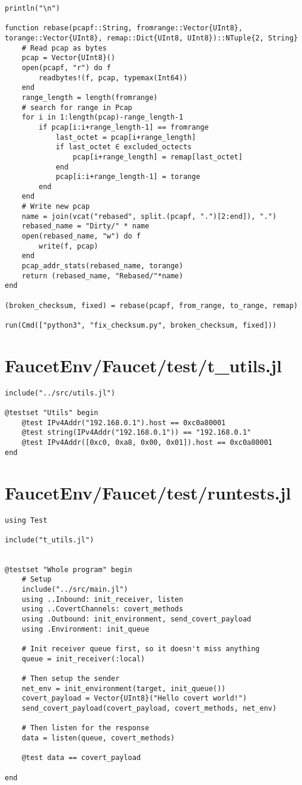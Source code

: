 \begin{lstlisting}[language=JuliaLocal, style=julia]
println("\n")

function rebase(pcapf::String, fromrange::Vector{UInt8}, torange::Vector{UInt8}, remap::Dict{UInt8, UInt8})::NTuple{2, String}
    # Read pcap as bytes
    pcap = Vector{UInt8}()
    open(pcapf, "r") do f
        readbytes!(f, pcap, typemax(Int64))
    end
    range_length = length(fromrange)
    # search for range in Pcap
    for i in 1:length(pcap)-range_length-1
        if pcap[i:i+range_length-1] == fromrange
            last_octet = pcap[i+range_length]
            if last_octet ∈ excluded_octects
                pcap[i+range_length] = remap[last_octet]
            end
            pcap[i:i+range_length-1] = torange
        end
    end
    # Write new pcap
    name = join(vcat("rebased", split.(pcapf, ".")[2:end]), ".")
    rebased_name = "Dirty/" * name
    open(rebased_name, "w") do f
        write(f, pcap)
    end
    pcap_addr_stats(rebased_name, torange)
    return (rebased_name, "Rebased/"*name)
end

(broken_checksum, fixed) = rebase(pcapf, from_range, to_range, remap)

run(Cmd(["python3", "fix_checksum.py", broken_checksum, fixed]))
\end{lstlisting}
\section{FaucetEnv/Faucet/test/t\_utils.jl}
\begin{lstlisting}[language=JuliaLocal, style=julia]
include("../src/utils.jl")

@testset "Utils" begin
	@test IPv4Addr("192.168.0.1").host == 0xc0a80001
	@test string(IPv4Addr("192.168.0.1")) == "192.168.0.1"
	@test IPv4Addr([0xc0, 0xa8, 0x00, 0x01]).host == 0xc0a80001
end
\end{lstlisting}
\section{FaucetEnv/Faucet/test/runtests.jl}
\begin{lstlisting}[language=JuliaLocal, style=julia]
using Test

include("t_utils.jl")


@testset "Whole program" begin
	# Setup
	include("../src/main.jl")
	using ..Inbound: init_receiver, listen
	using ..CovertChannels: covert_methods
	using .Outbound: init_environment, send_covert_payload
	using .Environment: init_queue

	# Init receiver queue first, so it doesn't miss anything
	queue = init_receiver(:local)

	# Then setup the sender
	net_env = init_environment(target, init_queue())
	covert_payload = Vector{UInt8}("Hello covert world!")
	send_covert_payload(covert_payload, covert_methods, net_env)

	# Then listen for the response
	data = listen(queue, covert_methods)

	@test data == covert_payload

end


\end{lstlisting}
